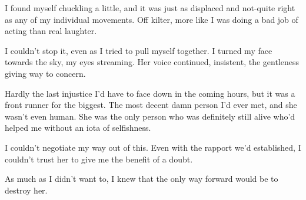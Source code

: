 I found myself chuckling a little, and it was just as displaced and not-quite right as any of my individual movements.  Off kilter, more like I was doing a bad job of acting than real laughter.



I couldn't stop it, even as I tried to pull myself together.  I turned my face towards the sky, my eyes streaming.  Her voice continued, insistent, the gentleness giving way to concern.



Hardly the last injustice I'd have to face down in the coming hours, but it was a front runner for the biggest.  The most decent damn person I'd ever met, and she wasn't even human.  She was the only person who was definitely still alive who'd helped me without an iota of selfishness.



I couldn't negotiate my way out of this.  Even with the rapport we'd established, I couldn't trust her to give me the benefit of a doubt.



As much as I didn't want to, I knew that the only way forward would be to destroy her.





